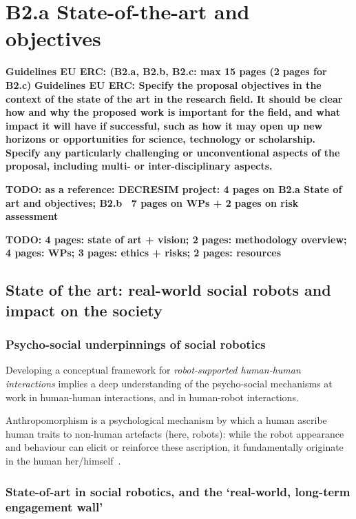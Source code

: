 \documentclass[11pt,a4paper]{report}
\newcommand{\TODO}[1]{{\color{red}\textbf{TODO: #1}}}
\newcommand{\eu}[1]{{\color{teal}\textbf{Guidelines EU ERC: #1}}}
\begin{document}
\chapter{B2.a State-of-the-art and objectives}

\eu{(B2.a, B2.b, B2.c: max 15 pages (2 pages for B2.c)}
\eu{Specify the proposal objectives in the context of the state
of the art in the research field. It should be clear how and why the proposed work is important for
the field, and what impact it will have if successful, such as how it may open up new horizons or
opportunities for science, technology or scholarship. Specify any particularly challenging or
unconventional aspects of the proposal, including multi- or inter-disciplinary aspects.}

\TODO{as a reference: DECRESIM project: 4 pages on B2.a State of art and
objectives; B2.b ~7 pages on WPs + 2 pages on risk assessment}

\TODO{4 pages: state of art + vision; 2 pages: methodology overview; 4 pages:
WPs; 3 pages: ethics + risks; 2 pages: resources}



\section{State of the art: real-world social robots and impact on the
society}


\subsection{Psycho-social underpinnings of social robotics}

Developing a conceptual framework for \emph{robot-supported human-human
interactions} implies a deep understanding of the psycho-social mechanisms at
work in human-human interactions, and in human-robot interactions.

Anthropomorphism is a psychological mechanism by which a human
ascribe human traits to non-human artefacts (here, robots): while the
robot appearance and behaviour can elicit or reinforce these ascription,
it fundamentally originate in the human her/himself~\cite{fink}.





\subsection{State-of-art in social robotics, and the `real-world, long-term
engagement wall'}
\end{document}
